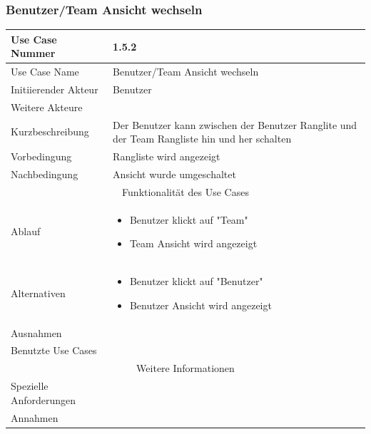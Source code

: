 \documentclass[10pt,a4paper]{article}
\begin{document}
\subsubsection{Benutzer/Team Ansicht wechseln}
	\begin{tabular}{|l|p{.5\linewidth}|}
	\hline Use Case Nummer & 1.5.2 \\ 
	\hline Use Case Name & Benutzer/Team Ansicht wechseln \\ 
	\hline Initiierender Akteur & Benutzer \\
	\hline Weitere Akteure &  \\
	\hline Kurzbeschreibung & Der Benutzer kann zwischen der Benutzer Ranglite und der Team Rangliste hin und her schalten \\
	\hline Vorbedingung & Rangliste wird angezeigt \\
	\hline Nachbedingung & Ansicht wurde umgeschaltet \\
	\hline \multicolumn{2}{|c|}{Funktionalität des Use Cases}\\
	\hline Ablauf & \begin{itemize}
		\item Benutzer klickt auf "Team"
		\item Team Ansicht wird angezeigt
	\end{itemize} \\
	\hline Alternativen & \begin{itemize}
				\item Benutzer klickt auf "Benutzer"
				\item Benutzer Ansicht wird angezeigt
			\end{itemize} \\
	\hline Ausnahmen &  \\
	\hline Benutzte Use Cases &  \\
	\hline \multicolumn{2}{|c|}{Weitere Informationen} \\
	\hline Spezielle Anforderungen &  \\
	\hline Annahmen &  \\
	\hline
	\end{tabular}
		
\end{document}
